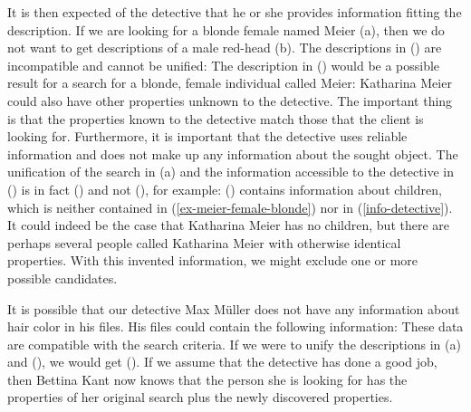 It is then expected of the detective that he or she provides information fitting the description. If
we are looking for a blonde female named Meier (a), then we
do not want to get descriptions of a male red-head (b). The descriptions in () are incompatible and cannot be unified:
\eal
\ex\label{ex-meier-female-blonde}
\ex {}
\zl
The description in () would be a possible result for a search for a blonde, female individual called Meier:
\ea
\label{info-detective}
\z
Katharina Meier could also have other properties unknown to the detective. The important thing is that the properties known to the detective match those
that the client is looking for. Furthermore, it is important that the detective uses reliable information and does not make up any information about the sought
object. The unification of the search in (a) and the information accessible to the detective in () is in fact () and not (), for example:
\ea
{}
\z
() contains information about children, which is neither contained in
(\ref{ex-meier-female-blonde}) nor in (\ref{info-detective}).
It could indeed be the case that Katharina Meier has no children, but there are perhaps several people
called Katharina Meier with otherwise identical properties. With this invented information, we might
exclude one or more possible candidates. 

It is possible that our detective Max Müller does not have any information about hair color in his
files. His files could contain the following information:
\ea
{}
\z
These data are compatible with the search criteria. If we were to unify the descriptions in (a) and (), we would get ().
If we assume that the detective has done a good job, then Bettina Kant now knows that the person she is looking for has the properties of her
original search plus the newly discovered properties.


